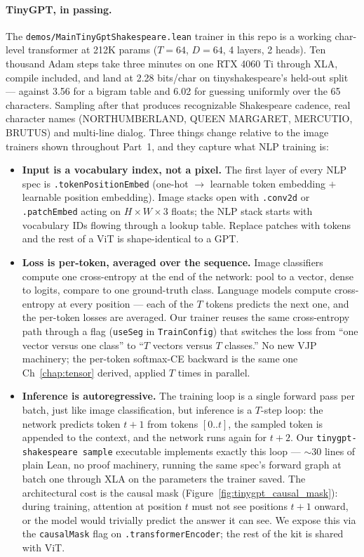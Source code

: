 \paragraph{TinyGPT, in passing.} The
\texttt{demos/MainTinyGptShakespeare.lean} trainer in this repo is a
working char-level transformer at 212K params ($T{=}64$, $D{=}64$,
4 layers, 2 heads). Ten thousand Adam steps take three minutes on one
RTX 4060 Ti through XLA, compile included, and land at 2.28 bits/char
on tinyshakespeare's held-out split --- against 3.56 for a bigram table
and 6.02 for guessing uniformly over the 65 characters. Sampling after
that produces recognizable Shakespeare cadence, real character names
(NORTHUMBERLAND, QUEEN MARGARET, MERCUTIO, BRUTUS) and multi-line
dialog. Three things change relative to the image trainers shown
throughout Part~1, and they capture what NLP training is:

\begin{itemize}
  \item \textbf{Input is a vocabulary index, not a pixel.} The first
    layer of every NLP spec is \texttt{.tokenPositionEmbed} (one-hot
    $\to$ learnable token embedding $+$ learnable position embedding).
    Image stacks open with \texttt{.conv2d} or \texttt{.patchEmbed}
    acting on $H \times W \times 3$ floats; the NLP stack starts with
    vocabulary IDs flowing through a lookup table. Replace patches
    with tokens and the rest of a ViT is shape-identical to a GPT.
  \item \textbf{Loss is per-token, averaged over the sequence.} Image
    classifiers compute one cross-entropy at the end of the network:
    pool to a vector, dense to logits, compare to one ground-truth
    class. Language models compute cross-entropy at every
    position --- each of the $T$ tokens predicts the next one, and the
    per-token losses are averaged. Our trainer reuses the same
    cross-entropy path through a flag (\texttt{useSeg} in
    \texttt{TrainConfig}) that switches the loss from ``one vector
    versus one class'' to ``$T$ vectors versus $T$ classes.'' No new
    VJP machinery; the per-token softmax-CE backward is the same one
    Ch~\ref{chap:tensor} derived, applied $T$ times in parallel.
  \item \textbf{Inference is autoregressive.} The training loop is a
    single forward pass per batch, just like image classification, but
    inference is a $T$-step loop: the network predicts token
    $t{+}1$ from tokens $[0..t]$, the sampled token is appended to the
    context, and the network runs again for $t{+}2$. Our
    \texttt{tinygpt-shakespeare sample} executable implements exactly
    this loop --- $\sim$30 lines of plain Lean, no proof machinery,
    running the same spec's forward graph at batch one through XLA on
    the parameters the trainer saved. The architectural
    cost is the causal mask (Figure~\ref{fig:tinygpt_causal_mask}):
    during training, attention at position
    $t$ must not see positions $t{+}1$ onward, or the model would
    trivially predict the answer it can see. We expose this via the
    \texttt{causalMask} flag on \texttt{.transformerEncoder}; the rest
    of the kit is shared with ViT.
\end{itemize}

